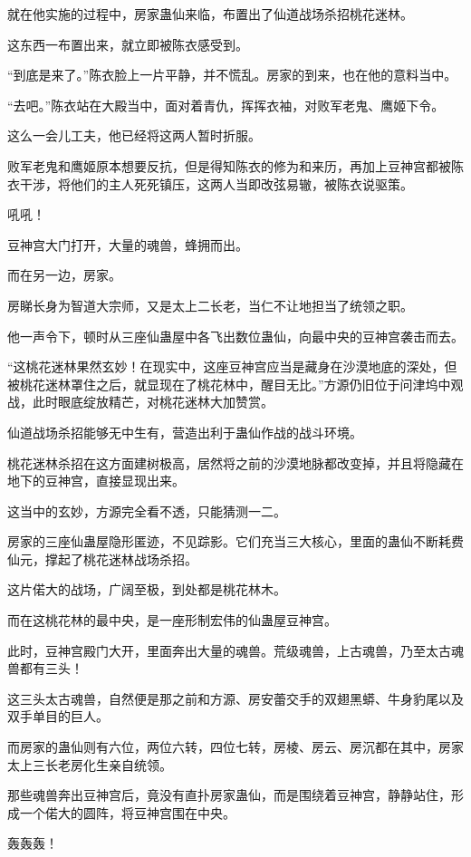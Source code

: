 \begin{this_body}
就在他实施的过程中，房家蛊仙来临，布置出了仙道战场杀招桃花迷林。

这东西一布置出来，就立即被陈衣感受到。

“到底是来了。”陈衣脸上一片平静，并不慌乱。房家的到来，也在他的意料当中。

“去吧。”陈衣站在大殿当中，面对着青仇，挥挥衣袖，对败军老鬼、鹰姬下令。

这么一会儿工夫，他已经将这两人暂时折服。

败军老鬼和鹰姬原本想要反抗，但是得知陈衣的修为和来历，再加上豆神宫都被陈衣干涉，将他们的主人死死镇压，这两人当即改弦易辙，被陈衣说驱策。

吼吼！

豆神宫大门打开，大量的魂兽，蜂拥而出。

而在另一边，房家。

房睇长身为智道大宗师，又是太上二长老，当仁不让地担当了统领之职。

他一声令下，顿时从三座仙蛊屋中各飞出数位蛊仙，向最中央的豆神宫袭击而去。

“这桃花迷林果然玄妙！在现实中，这座豆神宫应当是藏身在沙漠地底的深处，但被桃花迷林罩住之后，就显现在了桃花林中，醒目无比。”方源仍旧位于问津坞中观战，此时眼底绽放精芒，对桃花迷林大加赞赏。

仙道战场杀招能够无中生有，营造出利于蛊仙作战的战斗环境。

桃花迷林杀招在这方面建树极高，居然将之前的沙漠地脉都改变掉，并且将隐藏在地下的豆神宫，直接显现出来。

这当中的玄妙，方源完全看不透，只能猜测一二。

房家的三座仙蛊屋隐形匿迹，不见踪影。它们充当三大核心，里面的蛊仙不断耗费仙元，撑起了桃花迷林战场杀招。

这片偌大的战场，广阔至极，到处都是桃花林木。

而在这桃花林的最中央，是一座形制宏伟的仙蛊屋豆神宫。

此时，豆神宫殿门大开，里面奔出大量的魂兽。荒级魂兽，上古魂兽，乃至太古魂兽都有三头！

这三头太古魂兽，自然便是那之前和方源、房安蕾交手的双翅黑蟒、牛身豹尾以及双手单目的巨人。

而房家的蛊仙则有六位，两位六转，四位七转，房棱、房云、房沉都在其中，房家太上三长老房化生亲自统领。

那些魂兽奔出豆神宫后，竟没有直扑房家蛊仙，而是围绕着豆神宫，静静站住，形成一个偌大的圆阵，将豆神宫围在中央。

轰轰轰！


\end{this_body}
